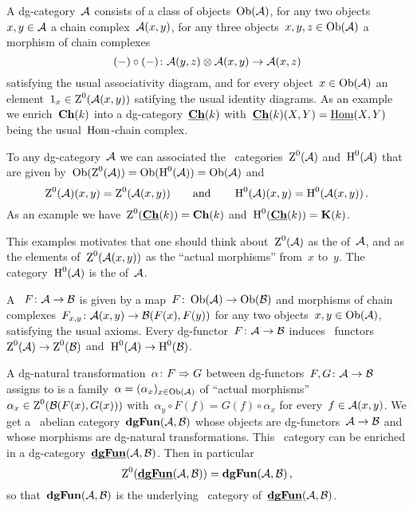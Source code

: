 \documentclass[a4paper,10pt]{scrartcl}
\begin{document}
A dg-category~$\mathcal{A}$ consists of a class of objects~$\operatorname{Ob}(\mathcal{A})$, for any two objects~$x, y \in \mathcal{A}$ a chain complex~$\mathcal{A}(x,y)$, for any three objects~$x, y, z \in \operatorname{Ob}(\mathcal{A})$ a morphism of chain complexes
\[
  (-) \circ (-)
  \colon
  \mathcal{A}(y,z) \otimes \mathcal{A}(x,y)
  \to
  \mathcal{A}(x,z)
\]
satisfying the usual associativity diagram, and for every object~$x \in \operatorname{Ob}(\mathcal{A})$ an element~$1_x \in \operatorname{Z}^0(\mathcal{A}(x,y))$ satifying the usual identity diagrams.
As an example we enrich~$\mathbf{Ch}(k)$ into a dg-category~$\underline{\mathbf{Ch}}(k)$ with~$\underline{\mathbf{Ch}}(k)(X,Y) = \underline{\operatorname{Hom}}(X,Y)$ being the usual~$\operatorname{Hom}$-chain complex.

To any dg-category~$\mathcal{A}$ we can associated the~{\klinear} categories~$\operatorname{Z}^0(\mathcal{A})$ and~$\operatorname{H}^0(\mathcal{A})$ that are given by~$\operatorname{Ob}(\operatorname{Z}^0(\mathcal{A})) = \operatorname{Ob}(\operatorname{H}^0(\mathcal{A})) = \operatorname{Ob}(\mathcal{A})$ and
\[
  \operatorname{Z}^0(\mathcal{A})(x,y)
  =
  \operatorname{Z}^0(\mathcal{A}(x,y))
  \qquad\text{and}\qquad
  \operatorname{H}^0(\mathcal{A})(x,y)
  =
  \operatorname{H}^0(\mathcal{A}(x,y)) \,.
\]
As an example we have~$\operatorname{Z}^0(\underline{\mathbf{Ch}}(k)) = \mathbf{Ch}(k)$ and~$\operatorname{H}^0(\underline{\mathbf{Ch}}(k)) = \mathbf{K}(k)$.

This examples motivates that one should think about~$\operatorname{Z}^0(\mathcal{A})$ as the  of~$\mathcal{A}$, and as the elements of~$\operatorname{Z}^0(\mathcal{A}(x,y))$ as the \enquote{actual morphisms} from~$x$ to~$y$.
The category~$\operatorname{H}^0(\mathcal{A})$ is the  of~$\mathcal{A}$.

A ~$F \colon \mathcal{A} \to \mathcal{B}$ is given by a map~$F \colon \operatorname{Ob}(\mathcal{A}) \to \operatorname{Ob}(\mathcal{B})$ and morphisms of chain complexes~$F_{x,y} \colon \mathcal{A}(x,y) \to \mathcal{B}(F(x), F(y))$ for any two objects~$x, y \in \operatorname{Ob}(\mathcal{A})$, satisfying the usual axioms.
Every dg-functor~$F \colon \mathcal{A} \to \mathcal{B}$ induces~{\klinear} functors~$\operatorname{Z}^0(\mathcal{A}) \to \operatorname{Z}^0(\mathcal{B})$ and~$\operatorname{H}^0(\mathcal{A}) \to \operatorname{H}^0(\mathcal{B})$.

A dg-natural transformation~$\alpha \colon F \Rightarrow G$ between dg-functors~$F, G \colon \mathcal{A} \to \mathcal{B}$ assigns to is a family~$\alpha = (\alpha_x)_{x \in \operatorname{Ob}(\mathcal{A})}$ of \enquote{actual morphisms}~$\alpha_x \in \operatorname{Z}^0(\mathcal{B}(F(x), G(x)))$ with~$\alpha_y \circ F(f) = G(f) \circ \alpha_x$ for every~$f \in \mathcal{A}(x,y)$.
We get a~{\klinear} abelian category~$\mathbf{dgFun}(\mathcal{A}, \mathcal{B})$ whose objects are dg-functors~$\mathcal{A} \to \mathcal{B}$ and whose morphisms are dg-natural transformations.
This~{\klinear} category can be enriched in a dg-category~$\underline{\smash{\mathbf{dgFun}}}(\mathcal{A}, \mathcal{B})$.
Then in particular
\[
  \operatorname{Z}^0(\underline{\smash{\mathbf{dgFun}}}(\mathcal{A}, \mathcal{B}))
  =
  \mathbf{dgFun}(\mathcal{A}, \mathcal{B}) \,,
\]
so that~$\mathbf{dgFun}(\mathcal{A}, \mathcal{B})$ is the underlying~{\klinear} category of~$\underline{\smash{\mathbf{dgFun}}}(\mathcal{A}, \mathcal{B})$.
\end{document}
